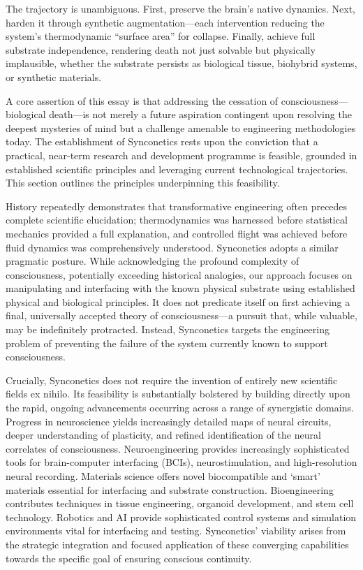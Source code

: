 \documentclass[10pt]{article}
\begin{document}
\begin{sloppypar}
  The trajectory is unambiguous. First, preserve the brain’s native dynamics. Next, harden it through synthetic augmentation—each intervention reducing the system’s thermodynamic “surface area” for collapse. Finally, achieve full substrate independence, rendering death not just solvable but physically implausible, whether the substrate persists as biological tissue, biohybrid systems, or synthetic materials.

  A core assertion of this essay is that addressing the cessation of consciousness—biological death—is not merely a future aspiration contingent upon resolving the deepest mysteries of mind but a challenge amenable to engineering methodologies today. The establishment of Synconetics rests upon the conviction that a practical, near-term research and development programme is feasible, grounded in established scientific principles and leveraging current technological trajectories. This section outlines the principles underpinning this feasibility.

  History repeatedly demonstrates that transformative engineering often precedes complete scientific elucidation; thermodynamics was harnessed before statistical mechanics provided a full explanation, and controlled flight was achieved before fluid dynamics was comprehensively understood. Synconetics adopts a similar pragmatic posture. While acknowledging the profound complexity of consciousness, potentially exceeding historical analogies, our approach focuses on manipulating and interfacing with the known physical substrate using established physical and biological principles. It does not predicate itself on first achieving a final, universally accepted theory of consciousness—a pursuit that, while valuable, may be indefinitely protracted. Instead, Synconetics targets the engineering problem of preventing the failure of the system currently known to support consciousness.

  Crucially, Synconetics does not require the invention of entirely new scientific fields ex nihilo. Its feasibility is substantially bolstered by building directly upon the rapid, ongoing advancements occurring across a range of synergistic domains. Progress in neuroscience yields increasingly detailed maps of neural circuits, deeper understanding of plasticity, and refined identification of the neural correlates of consciousness. Neuroengineering provides increasingly sophisticated tools for brain-computer interfacing (BCIs), neurostimulation, and high-resolution neural recording. Materials science offers novel biocompatible and ‘smart’ materials essential for interfacing and substrate construction. Bioengineering contributes techniques in tissue engineering, organoid development, and stem cell technology. Robotics and AI provide sophisticated control systems and simulation environments vital for interfacing and testing. Synconetics’ viability arises from the strategic integration and focused application of these converging capabilities towards the specific goal of ensuring conscious continuity.


\end{sloppypar}
\end{document}
